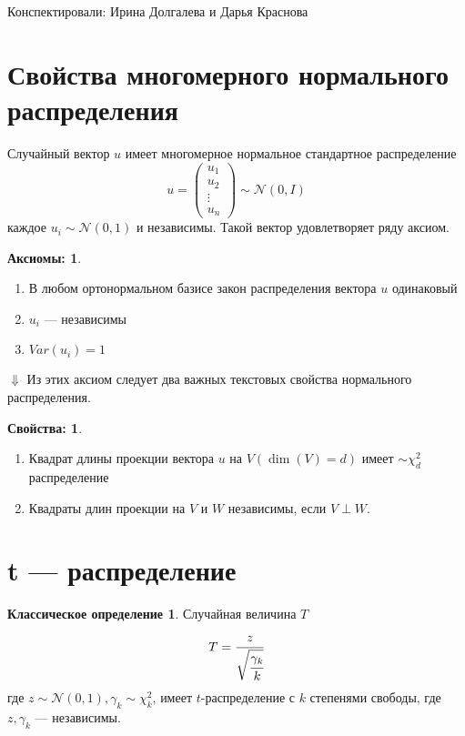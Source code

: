 \documentclass[12pt]{article} %
\theoremstyle{definition} %
\def \cN{\mathcal{N}}
\def \cChi{\mathcal{\chi}}
\begin{document}
Конспектировали: Ирина Долгалева и Дарья Краснова

\section{Свойства многомерного нормального распределения}
    Случайный вектор $u$ имеет многомерное нормальное стандартное распределение 
    \[
        u = \begin{pmatrix} u_1 \\ u_2 \\ \vdots \\ u_n \end{pmatrix} \sim \cN(0, I)
    \]
    каждое $u_i \sim\cN(0, 1)$ и независимы.
Такой вектор удовлетворяет ряду аксиом.
\newtheorem*{axiom}{Аксиомы:}
\begin{axiom}
    \begin{enumerate}
        \item В любом ортонормальном базисе закон распределения вектора $u$ одинаковый
        \item $u_i$ — независимы
        \item $Var(u_i) = 1$
    \end{enumerate} 
\end{axiom}    
\par
$\Downarrow$ Из этих аксиом следует два важных текстовых свойства нормального распределения.    

\newtheorem*{prop}{Свойства:}
\begin{prop}    
    \begin{enumerate}    
        \item Квадрат длины проекции вектора $u$ на $V (\dim(V) = d)$ имеет $\sim\cChi_{d}^2$ распределение
        \item Квадраты длин проекции на $V$ и $W$ независимы, если  $V \perp W$.
    \end{enumerate}
\end{prop}
 


\section{t — распределение}
\newtheorem*{classic_def}{Классическое определение}
\begin{classic_def}\hspace{2cm} \par
\smallskip
    Случайная величина $T$
    \[
        T = \cfrac{z}{\sqrt{\cfrac{\gamma_k}{k}}}
    \]
    где $z \sim \cN(0,1), \gamma_k \sim \cChi_k^2$,
    имеет $t$-распределение с $k$ степенями свободы, где $z, \gamma_k$  — независимы.
\end{classic_def}
\end{document}
